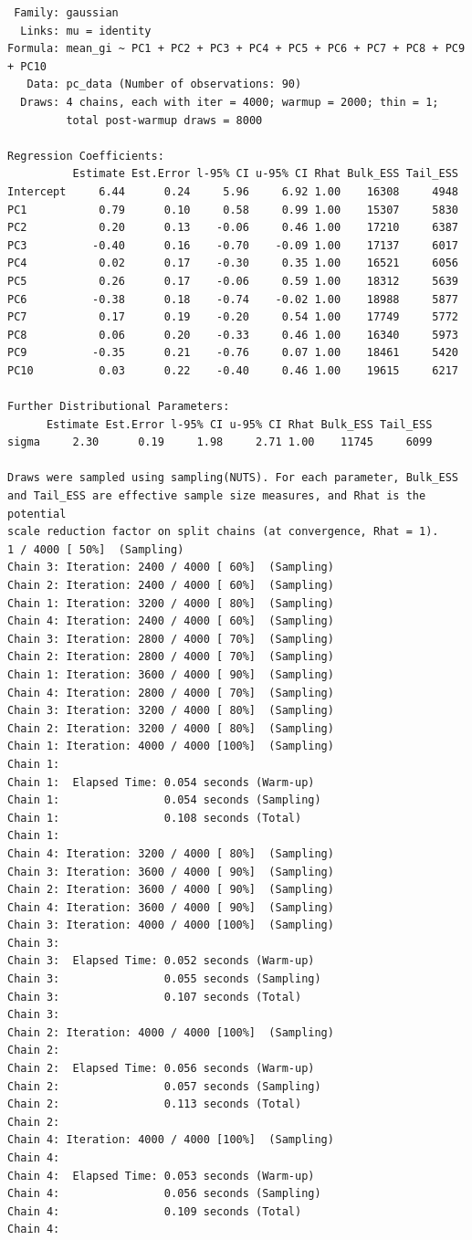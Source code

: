 \documentclass[
  letterpaper,
  DIV=11,
  numbers=noendperiod]{scrartcl}
\begin{document}
\begin{verbatim}
 Family: gaussian 
  Links: mu = identity 
Formula: mean_gi ~ PC1 + PC2 + PC3 + PC4 + PC5 + PC6 + PC7 + PC8 + PC9 + PC10 
   Data: pc_data (Number of observations: 90) 
  Draws: 4 chains, each with iter = 4000; warmup = 2000; thin = 1;
         total post-warmup draws = 8000

Regression Coefficients:
          Estimate Est.Error l-95% CI u-95% CI Rhat Bulk_ESS Tail_ESS
Intercept     6.44      0.24     5.96     6.92 1.00    16308     4948
PC1           0.79      0.10     0.58     0.99 1.00    15307     5830
PC2           0.20      0.13    -0.06     0.46 1.00    17210     6387
PC3          -0.40      0.16    -0.70    -0.09 1.00    17137     6017
PC4           0.02      0.17    -0.30     0.35 1.00    16521     6056
PC5           0.26      0.17    -0.06     0.59 1.00    18312     5639
PC6          -0.38      0.18    -0.74    -0.02 1.00    18988     5877
PC7           0.17      0.19    -0.20     0.54 1.00    17749     5772
PC8           0.06      0.20    -0.33     0.46 1.00    16340     5973
PC9          -0.35      0.21    -0.76     0.07 1.00    18461     5420
PC10          0.03      0.22    -0.40     0.46 1.00    19615     6217

Further Distributional Parameters:
      Estimate Est.Error l-95% CI u-95% CI Rhat Bulk_ESS Tail_ESS
sigma     2.30      0.19     1.98     2.71 1.00    11745     6099

Draws were sampled using sampling(NUTS). For each parameter, Bulk_ESS
and Tail_ESS are effective sample size measures, and Rhat is the potential
scale reduction factor on split chains (at convergence, Rhat = 1).
1 / 4000 [ 50%]  (Sampling)
Chain 3: Iteration: 2400 / 4000 [ 60%]  (Sampling)
Chain 2: Iteration: 2400 / 4000 [ 60%]  (Sampling)
Chain 1: Iteration: 3200 / 4000 [ 80%]  (Sampling)
Chain 4: Iteration: 2400 / 4000 [ 60%]  (Sampling)
Chain 3: Iteration: 2800 / 4000 [ 70%]  (Sampling)
Chain 2: Iteration: 2800 / 4000 [ 70%]  (Sampling)
Chain 1: Iteration: 3600 / 4000 [ 90%]  (Sampling)
Chain 4: Iteration: 2800 / 4000 [ 70%]  (Sampling)
Chain 3: Iteration: 3200 / 4000 [ 80%]  (Sampling)
Chain 2: Iteration: 3200 / 4000 [ 80%]  (Sampling)
Chain 1: Iteration: 4000 / 4000 [100%]  (Sampling)
Chain 1: 
Chain 1:  Elapsed Time: 0.054 seconds (Warm-up)
Chain 1:                0.054 seconds (Sampling)
Chain 1:                0.108 seconds (Total)
Chain 1: 
Chain 4: Iteration: 3200 / 4000 [ 80%]  (Sampling)
Chain 3: Iteration: 3600 / 4000 [ 90%]  (Sampling)
Chain 2: Iteration: 3600 / 4000 [ 90%]  (Sampling)
Chain 4: Iteration: 3600 / 4000 [ 90%]  (Sampling)
Chain 3: Iteration: 4000 / 4000 [100%]  (Sampling)
Chain 3: 
Chain 3:  Elapsed Time: 0.052 seconds (Warm-up)
Chain 3:                0.055 seconds (Sampling)
Chain 3:                0.107 seconds (Total)
Chain 3: 
Chain 2: Iteration: 4000 / 4000 [100%]  (Sampling)
Chain 2: 
Chain 2:  Elapsed Time: 0.056 seconds (Warm-up)
Chain 2:                0.057 seconds (Sampling)
Chain 2:                0.113 seconds (Total)
Chain 2: 
Chain 4: Iteration: 4000 / 4000 [100%]  (Sampling)
Chain 4: 
Chain 4:  Elapsed Time: 0.053 seconds (Warm-up)
Chain 4:                0.056 seconds (Sampling)
Chain 4:                0.109 seconds (Total)
Chain 4: 
\end{verbatim}
\end{document}

